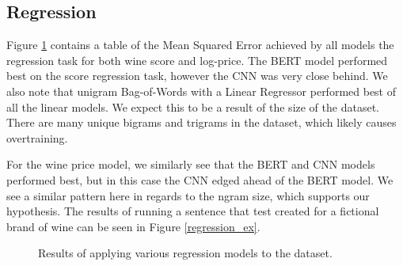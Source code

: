 \documentclass[12pt]{IEEEtran}
\begin{document}
\subsection{Regression}



    Figure \ref{regression_results} contains a table of the Mean Squared Error achieved by all models the regression task for both wine score and log-price. The BERT model performed best on the score regression task, however the CNN was very close behind. We also note that unigram Bag-of-Words with a Linear Regressor performed best of all the linear models. We expect this to be a result of the size of the dataset. There are many unique bigrams and trigrams in the dataset, which likely causes overtraining. \par
    For the wine price model, we similarly see that the BERT and CNN models performed best, but in this case the CNN edged ahead of the BERT model. We see a similar pattern here in regards to the ngram size, which supports our hypothesis. The results of running a sentence that test created for a fictional brand of wine can be seen in Figure \ref{regression_ex}.
\begin{figure}[H]
    \centering
    \caption{ Results of applying various regression models to the dataset. }
    \label{regression_results}
\end{figure}
\end{document}
